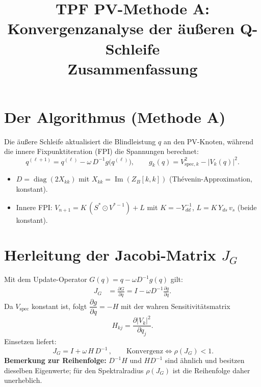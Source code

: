 \documentclass[11pt]{article}
\title{TPF PV-Methode A: Konvergenzanalyse der äußeren Q-Schleife\\
	\large Zusammenfassung}
\author{}
\date{}
\begin{document}
	\maketitle
	
	\section{Der Algorithmus (Methode A)}
	Die äußere Schleife aktualisiert die Blindleistung $q$ an den PV-Knoten,
	während die innere Fixpunktiteration (FPI) die Spannungen berechnet:
	\begin{equation}
		q^{(\ell+1)} = q^{(\ell)} - \omega\, D^{-1} g\big(q^{(\ell)}\big),
		\qquad
		g_k(q) = V_{\mathrm{spec},k}^2 - |V_k(q)|^2 .
	\end{equation}
	\begin{itemize}
		\item $D = \operatorname{diag}(2X_{kk})$ mit $X_{kk} = \operatorname{Im}(Z_B[k,k])$
		(Thévenin-Approximation, konstant).
		\item Innere FPI: $V_{n+1} = K\,(S^\ast \odot V^{\ast-1}) + L$ mit
		$K = -Y_{dd}^{-1}$, $L = K\,Y_{ds}\,v_s$ (beide konstant).
	\end{itemize}
	
	\section{Herleitung der Jacobi-Matrix $J_G$}
	Mit dem Update-Operator $G(q) = q - \omega D^{-1} g(q)$ gilt:
	\begin{align}
		J_G &= \frac{\partial G}{\partial q}
		= I - \omega D^{-1}\frac{\partial g}{\partial q}.
	\end{align}
	Da $V_{\mathrm{spec}}$ konstant ist, folgt
	$\dfrac{\partial g}{\partial q} = -H$ mit der wahren Sensitivitätsmatrix
	\begin{equation}
		H_{kj} = \frac{\partial |V_k|^2}{\partial q_j}.
	\end{equation}
	Einsetzen liefert:
	\begin{equation}
		\boxed{\,J_G = I + \omega\, H\, D^{-1}\,},
		\qquad \text{Konvergenz} \iff \rho(J_G) < 1.
	\end{equation}
	\textbf{Bemerkung zur Reihenfolge:} $D^{-1}H$ und $HD^{-1}$ sind ähnlich
	und besitzen dieselben Eigenwerte; für den Spektralradius $\rho(J_G)$
	ist die Reihenfolge daher unerheblich.
	
\end{document}
